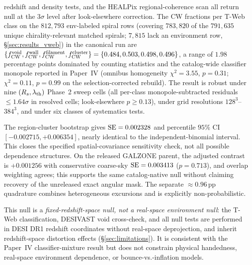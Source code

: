 \documentclass[twocolumn,linenumbers]{aastex702}
\begin{document}
redshift and density tests, and the HEALPix regional-coherence scan
all return null at the $3\sigma$ level after look-elsewhere correction.
The CW fractions per T-Web class on the $812{,}793$ env-labeled spiral
rows (covering $783{,}820$ of the $791{,}635$ unique chirality-relevant
matched spirals; $7{,}815$ lack an environment row,
\S\ref{sec:results_vweb}) in the canonical run are
$\{f_{\rm CW}^{\rm void}, f_{\rm CW}^{\rm wall},
f_{\rm CW}^{\rm filament}, f_{\rm CW}^{\rm cluster}\} =
\{0.484, 0.503, 0.498, 0.496\}$, a range of $1.98$\,percentage points
dominated by counting statistics and the catalog-wide classifier
monopole reported in Paper~IV (omnibus homogeneity
$\chi^2 = 3.55$, $p = 0.31$; $\chi^2 = 0.11$, $p = 0.99$ on the
selection-corrected rebuild). The result is robust under nine
$(R_s, \lambda_{\rm th})$ Phase~2 sweep cells (all per-class
monopole-subtracted residuals $\le 1.64\sigma$ in resolved cells; look-elsewhere
$p \ge 0.13$), under grid resolutions $128^3$--$384^3$, and under six
classes of systematics tests.

The region-cluster bootstrap gives ${\rm SE}=0.002328$ and percentile
$95\%$ CI $[-0.002715,+0.006354]$, nearly identical to the
independent-binomial interval. This closes the specified
spatial-covariance sensitivity check, not all possible dependence
structures. On the released GALZONE parent, the adjusted contrast is
$+0.001256$ with conservative coarse-sky ${\rm SE}=0.003413$
($p=0.713$), and overlap weighting agrees; this supports the same
catalog-native null without claiming recovery of the unreleased exact
angular mask. The separate ${\approx}0.96$\,pp quadrature combines
heterogeneous excursions and is explicitly non-probabilistic.

\begin{center}\end{center}
This null is a \emph{fixed-redshift-space null, not a real-space
environment null}: the T-Web classification, DESIVAST void cross-check,
and all null tests are performed in DESI DR1 redshift coordinates without
real-space deprojection, and inherit redshift-space distortion effects
(\S\ref{sec:limitations}). It is consistent with the Paper~IV
classifier-mixture result but does not constrain physical handedness,
real-space environment dependence, or bounce-vs.-inflation models.
\end{document}
